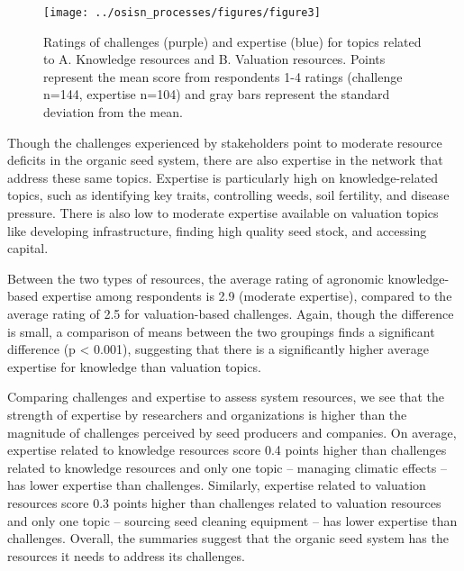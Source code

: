 \documentclass[twoside,12pt,final]{ucthesis-CA2012}
\begin{document}
\begin{ucmainmatter}
\begin{figure}
{\centering \texttt{[image: ../osisn\_processes/figures/figure3]} 

}

\caption{Ratings of challenges (purple) and expertise (blue) for topics related to A. Knowledge resources and B. Valuation resources. Points represent the mean score from respondents 1-4 ratings (challenge n=144, expertise n=104) and gray bars represent the standard deviation from the mean.}\label{fig:unnamed-chunk-25}
\end{figure}
Though the challenges experienced by stakeholders point to moderate
resource deficits in the organic seed system, there are also expertise
in the network that address these same topics. Expertise is particularly
high on knowledge-related topics, such as identifying key traits,
controlling weeds, soil fertility, and disease pressure. There is also
low to moderate expertise available on valuation topics like developing
infrastructure, finding high quality seed stock, and accessing capital.

Between the two types of resources, the average rating of agronomic
knowledge-based expertise among respondents is 2.9 (moderate expertise),
compared to the average rating of 2.5 for valuation-based challenges.
Again, though the difference is small, a comparison of means between the
two groupings finds a significant difference (p \textless{} 0.001), suggesting
that there is a significantly higher average expertise for knowledge
than valuation topics.

Comparing challenges and expertise to assess system resources, we see
that the strength of expertise by researchers and organizations is
higher than the magnitude of challenges perceived by seed producers and
companies. On average, expertise related to knowledge resources score
0.4 points higher than challenges related to knowledge resources and
only one topic -- managing climatic effects -- has lower expertise than
challenges. Similarly, expertise related to valuation resources score
0.3 points higher than challenges related to valuation resources and
only one topic -- sourcing seed cleaning equipment -- has lower
expertise than challenges. Overall, the summaries suggest that the
organic seed system has the resources it needs to address its
challenges.


\end{ucmainmatter}
\end{document}
